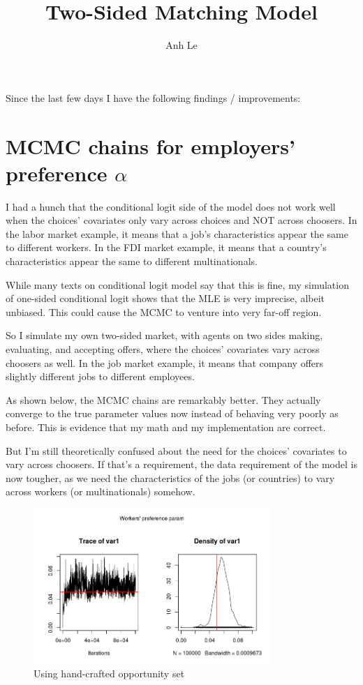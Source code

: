 \documentclass[12pt]{article}
\title{Two-Sided Matching Model}
\author{Anh Le}
\begin{document}
\maketitle

Since the last few days I have the following findings / improvements:

\section{MCMC chains for employers' preference $\alpha$}

I had a hunch that the conditional logit side of the model does not work well
when the choices' covariates only vary across choices and NOT across choosers.
In the labor market example, it means that a job's characteristics appear the
same to different workers. In the FDI market example, it means that a country's
characteristics appear the same to different multinationals.

While many texts on conditional logit model say that this is fine, my simulation
of one-sided conditional logit shows that the MLE is very imprecise, albeit
unbiased. This could cause the MCMC to venture into very far-off region.

So I simulate my own two-sided market, with agents on two sides making,
evaluating, and accepting offers, where the choices' covariates vary across
choosers as well. In the job market example, it means that company offers
slightly different jobs to different employees.

As shown below, the MCMC chains are remarkably better. They actually converge to
the true parameter values now instead of behaving very poorly as before. This is
evidence that my math and my implementation are correct.

But I'm still theoretically confused about the need for the choices' covariates
to vary across choosers. If that's a requirement, the data requirement of the
model is now tougher, as we need the characteristics of the jobs
(or countries) to vary across workers (or multinationals) somehow.

\begin{figure}[!ht]
\centering
\includegraphics[width=0.8\textwidth]{../figure/worker_alpha_starting_opp}
\caption{Using hand-crafted opportunity set}
\end{figure}
\end{document}
